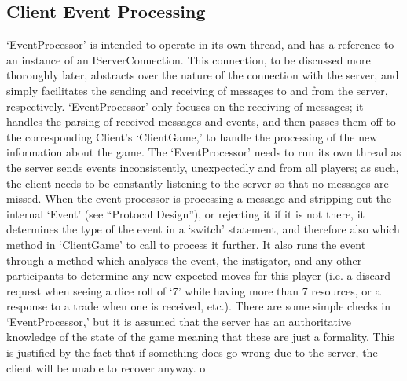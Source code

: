 \documentclass[a4paper,doc,draftfirst]{apa6}
\begin{document}
\subsection{Client Event Processing}
‘EventProcessor’ is intended to operate in its own thread, and has a reference to an instance of an IServerConnection. This connection, to be discussed more thoroughly later, abstracts over the nature of the connection with the server, and simply facilitates the sending and receiving of messages to and from the server, respectively. ‘EventProcessor’ only focuses on the receiving of messages; it handles the parsing of received messages and events, and then passes them off to the corresponding Client’s ‘ClientGame,’ to handle the processing of the new information about the game. The ‘EventProcessor’ needs to run its own thread as the server sends events inconsistently, unexpectedly and from all players; as such, the client needs to be constantly listening to the server so that no messages are missed. When the event processor is processing a message and stripping out the internal ‘Event’  (see “Protocol Design”), or rejecting it if it is not there, it determines the type of the event in a ‘switch’ statement, and therefore also which method in ‘ClientGame’ to call to process it further. It also runs the event through a method which analyses the event, the instigator, and any other participants to determine any new expected moves for this player (i.e. a discard request when seeing a dice roll of ‘7’ while having more than 7 resources, or a response to a trade when one is received, etc.). There are some simple checks in ‘EventProcessor,’ but it is assumed that the server has an authoritative knowledge of the state of the game meaning that these are just a formality. This is justified by the fact that if something does go wrong due to the server, the client will be unable to recover anyway. o
\end{document}
